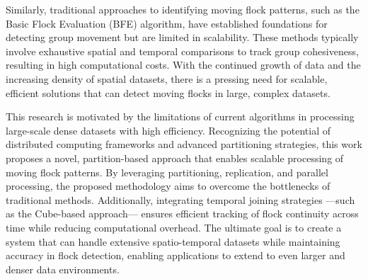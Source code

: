 Similarly, traditional approaches to identifying moving flock patterns, such as the Basic Flock Evaluation (BFE) algorithm, have established foundations for 
detecting group movement but are limited in scalability. These methods typically involve exhaustive spatial and temporal comparisons to track group 
cohesiveness, resulting in high computational costs. With the continued growth of data and the increasing density of spatial datasets, there is a pressing need 
for scalable, efficient solutions that can detect moving flocks in large, complex datasets.

This research is motivated by the limitations of current algorithms in processing large-scale dense datasets with high efficiency. Recognizing the potential of 
distributed computing frameworks and advanced partitioning strategies, this work proposes a novel, partition-based approach that enables scalable processing of 
moving flock patterns. By leveraging partitioning, replication, and parallel processing, the proposed methodology aims to overcome the bottlenecks of 
traditional methods. Additionally, integrating temporal joining strategies —such as the Cube-based approach— ensures efficient tracking of flock continuity 
across time while reducing computational overhead. The ultimate goal is to create a system that can handle extensive spatio-temporal datasets while maintaining 
accuracy in flock detection, enabling applications to extend to even larger and denser data environments.
